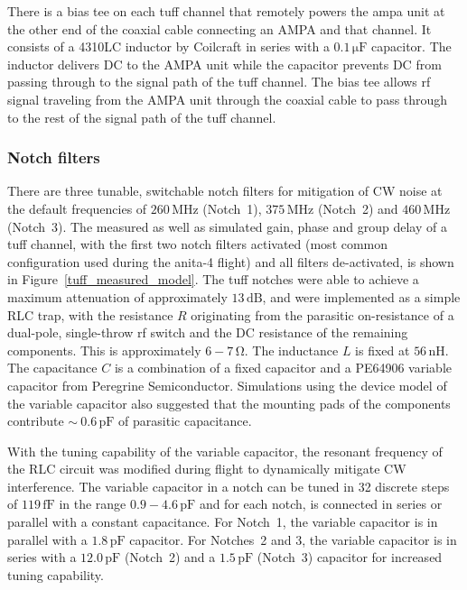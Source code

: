 There is a bias tee on each \gls{tuff} channel that 
remotely powers the \gls{ampa} unit at the other end of the coaxial cable connecting an AMPA and that channel. 
It consists of a 4310LC inductor by Coilcraft in series with a $0.1\,\mathrm{\mu F}$ capacitor. 
The inductor delivers DC to the AMPA unit while the capacitor prevents DC from passing through to the signal path of the \gls{tuff} channel. 
The bias tee allows \gls{rf} signal traveling from the AMPA unit through the coaxial cable to pass 
through to the rest of the signal path of the \gls{tuff} channel. 

\subsubsection{Notch filters} 

There are three tunable, switchable notch filters 
for mitigation of CW noise at the default frequencies of $260\,\mbox{MHz}$ (Notch~1), $375\,\mbox{MHz}$ (Notch~2) 
and $460\,\mbox{MHz}$ (Notch~3). 
The measured as well as simulated gain, phase and group delay of a \gls{tuff} channel, with the first two notch filters activated (most common configuration used during the \gls{anita}-4 flight) and all filters de-activated, is shown in Figure~\ref{tuff_measured_model}. 
The \gls{tuff} notches were able to achieve a maximum attenuation of approximately $13\, \mathrm{dB}$, and were implemented as a simple RLC trap, with the resistance $R$
originating from the parasitic on-resistance of a dual-pole, single-throw
\gls{rf} switch and the DC resistance of the remaining components. This is approximately $6 - 7\,\mathrm{\Omega}$. 
The inductance $L$ is fixed at $56\,\mathrm{nH}$. The capacitance $C$ is a
combination of a fixed capacitor and a PE64906 variable capacitor from Peregrine Semiconductor. Simulations using the device model of the variable capacitor also suggested that the mounting pads of the components contribute $\sim~0.6\,\mbox{pF}$ of parasitic capacitance.

With the 
tuning capability of the variable capacitor, the resonant frequency of the RLC circuit was 
modified during flight to dynamically mitigate CW interference. 
The variable capacitor in a notch can be 
tuned in 32 discrete steps of $119\,\mathrm{fF}$ in the range $0.9-4.6\,\mathrm{pF}$ and for 
each notch, is connected in series or parallel with a constant capacitance. 
For Notch~1, the variable capacitor is 
in parallel with a $1.8\,\mathrm{pF}$ capacitor. For Notches~2 and 3, the variable capacitor is in 
series with a $12.0\,\mathrm{pF}$ (Notch~2) and a $1.5\,\mathrm{pF}$ (Notch~3) capacitor for 
increased tuning capability. 

